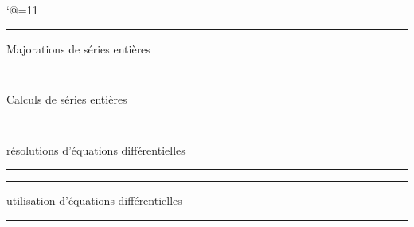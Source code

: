 \catcode`@=11\relax




\vglue-10mm
\bigskip

\hrule
\centerline{Majorations de séries entières}
\hrule
\bigskip
{}
\hrule
\centerline{Calculs de séries entières}
\hrule
{}
\bigskip
{}
\bigskip
{}
\bigskip
{}

\hrule
\centerline{résolutions d'équations différentielles}
\hrule
\bigskip
{}
\bigskip
{}
\bigskip
\hrule
\centerline{utilisation d'équations différentielles}
\hrule
\bigskip


\bigskip
{}



\bigskip
{}
\bigskip

\bigskip
{}
\bigskip
{}
\bigskip
\vfill\vfill\vfill\vfil\vfill\vfill\vfill\vfill\vfill\vfill\vfill\vfill\null
\bye
